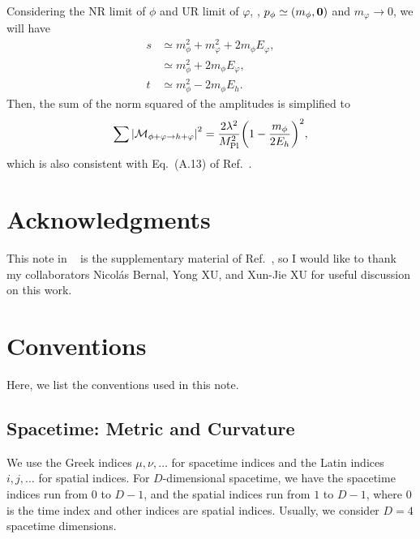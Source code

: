 \documentclass{article}
\begin{document}
            Considering the NR limit of $\phi$ and UR limit of $\varphi$, \ie, $p_\phi \simeq \qty(m_\phi, \vb{0})$ and $m_\varphi \to 0$, we will have
            \begin{equation}
                \begin{aligned}
                    s & \simeq m_\phi^2 + m_\varphi^2 + 2 m_\phi E_\varphi, \\
                    & \simeq m_\phi^2 + 2 m_\phi E_\varphi, \\
                    t & \simeq m_\phi^2 - 2 m_\phi E_h.
                \end{aligned}
            \end{equation}
            Then, the sum of the norm squared of the amplitudes is simplified to
            \begin{equation}
                \sumMsqr[\phi + \varphi \to h + \varphi] = \frac{2 \lambda^2}{\MPl^2} \qty(1 - \frac{m_\phi}{2 E_h})^2,
            \end{equation}
            which is also consistent with Eq.~(A.13) of Ref.~\cite{Xu:2024fjl}.

    \section*{Acknowledgments}
    
        This note in \faGithub~\githubsrc{} is the supplementary material of Ref.~\cite{Bernal:2025lxp}, so I would like to thank my collaborators Nicolás Bernal, Yong XU, and Xun-Jie XU for useful discussion on this work.

    \clearpage
    \appendix

    \section{Conventions}\label{app:convention}

        Here, we list the conventions used in this note.

        \subsection{Spacetime: Metric and Curvature}
        
            We use the Greek indices $\mu, \nu, \ldots$ for spacetime indices and the Latin indices $i, j, \ldots$ for spatial indices.
            For $D$-dimensional spacetime, we have the spacetime indices run from $0$ to $D - 1$, and the spatial indices run from $1$ to $D - 1$, where $0$ is the time index and other indices are spatial indices.
            Usually, we consider $D = 4$ spacetime dimensions.
\end{document}
